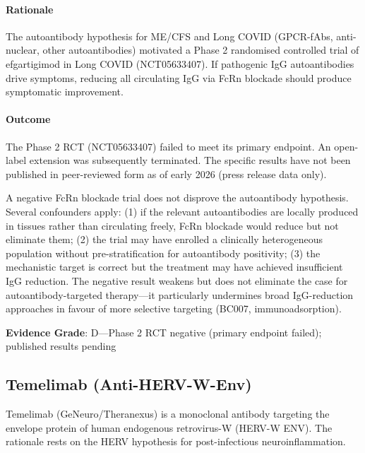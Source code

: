 \paragraph{Rationale}

The autoantibody hypothesis for ME/CFS and Long COVID (GPCR-fAbs, anti-nuclear, other autoantibodies) motivated a Phase 2 randomised controlled trial of efgartigimod in Long COVID (NCT05633407). If pathogenic IgG autoantibodies drive symptoms, reducing all circulating IgG via FcRn blockade should produce symptomatic improvement.

\paragraph{Outcome}

The Phase 2 RCT (NCT05633407) failed to meet its primary endpoint. An open-label extension was subsequently terminated. The specific results have not been published in peer-reviewed form as of early 2026 (press release data only).

\begin{limitation}
A negative FcRn blockade trial does not disprove the autoantibody hypothesis. Several confounders apply: (1) if the relevant autoantibodies are locally produced in tissues rather than circulating freely, FcRn blockade would reduce but not eliminate them; (2) the trial may have enrolled a clinically heterogeneous population without pre-stratification for autoantibody positivity; (3) the mechanistic target is correct but the treatment may have achieved insufficient IgG reduction. The negative result weakens but does not eliminate the case for autoantibody-targeted therapy---it particularly undermines broad IgG-reduction approaches in favour of more selective targeting (BC007, immunoadsorption).
\end{limitation}

\textbf{Evidence Grade}: D---Phase 2 RCT negative (primary endpoint failed); published results pending

\subsection{Temelimab (Anti-HERV-W-Env)}
\label{subsec:temelimab}

Temelimab (GeNeuro/Theranexus) is a monoclonal antibody targeting the envelope protein of human endogenous retrovirus-W (HERV-W ENV). The rationale rests on the HERV hypothesis for post-infectious neuroinflammation.

